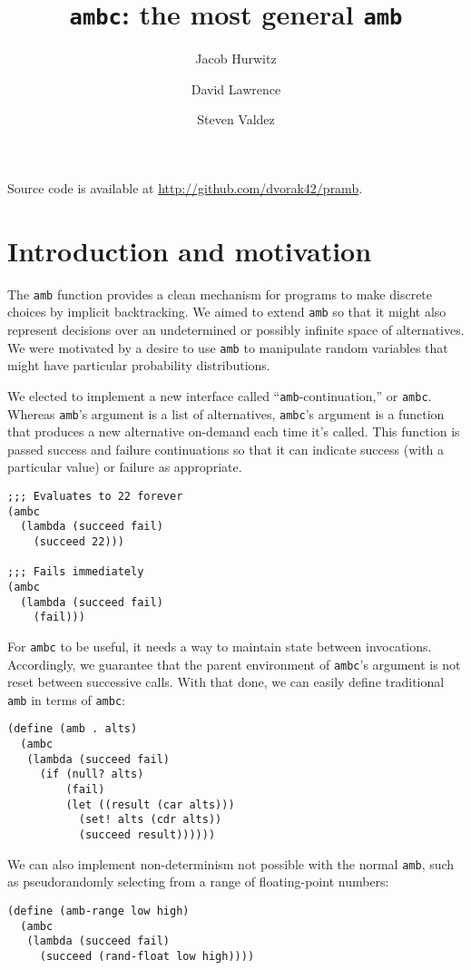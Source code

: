 \documentclass{article}
\title{\texttt{ambc}: the most general \texttt{amb}}
\author{Jacob Hurwitz \and David Lawrence \and Steven Valdez}
\begin{document}
\maketitle

\begin{center}
  Source code is available at \url{http://github.com/dvorak42/pramb}.
\end{center}

\section{Introduction and motivation}

The \texttt{amb} function provides a clean mechanism for programs to make
discrete choices by implicit backtracking.  We aimed to extend \texttt{amb} so
that it might also represent decisions over an undetermined or possibly
infinite space of alternatives.  We were motivated by a desire to use
\texttt{amb} to manipulate random variables that might have particular
probability distributions.

We elected to implement a new interface called ``\texttt{amb}-continuation,''
or \texttt{ambc}.  Whereas \texttt{amb}'s argument is a list of alternatives,
\texttt{ambc}'s argument is a function that produces a new alternative
on-demand each time it's called. This function is passed success and failure
continuations so that it can indicate success (with a particular value) or
failure as appropriate.

\begin{lstlisting}
;;; Evaluates to 22 forever
(ambc
  (lambda (succeed fail)
    (succeed 22)))

;;; Fails immediately
(ambc
  (lambda (succeed fail)
    (fail)))
\end{lstlisting}

For \texttt{ambc} to be useful, it needs a way to maintain state between
invocations.  Accordingly, we guarantee that the parent environment of
\texttt{ambc}'s argument is not reset between successive calls.  With that
done, we can easily define traditional \texttt{amb} in terms of \texttt{ambc}:
\begin{lstlisting}
(define (amb . alts)
  (ambc
   (lambda (succeed fail)
     (if (null? alts)
         (fail)
         (let ((result (car alts)))
           (set! alts (cdr alts))
           (succeed result))))))
\end{lstlisting}

We can also implement non-determinism not possible with the normal
\texttt{amb}, such as pseudorandomly selecting from a range of
floating-point numbers:
\begin{lstlisting}
(define (amb-range low high)
  (ambc
   (lambda (succeed fail)
     (succeed (rand-float low high))))
\end{lstlisting}
\end{document}
